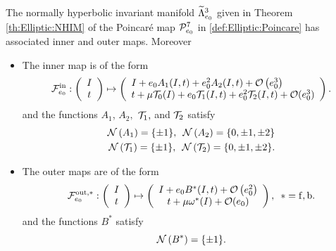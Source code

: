 \begin{theorem}\label{th:InnerAndOuter:Elliptic}
  The normally hyperbolic invariant manifold $\widetilde\Lambda^3_{e_0}$ given in Theorem \ref{th:Elliptic:NHIM}
  of the Poincar{\'e} map $\mathcal{P}^7_{e_0}$ in \eqref{def:Elliptic:Poincare} has associated inner and outer maps.
  Moreover
\begin{itemize}
  \item The inner map is of the form
    \begin{equation}\label{def:InnerMap:ell:th}
      \mathcal{F}_{e_0}^{\mathrm{in}}:\left(\begin{array}{c} I\\
          t
        \end{array}\right)\mapsto \left(\begin{array}{l} I+ e_0 A_1(I,t)+e_0^2 A_2(I,t)+\mathcal{O}\left(e_0^3\right)\\
          t+\mu\mathcal{T}_0(I)+e_0 \mathcal{T}_1(I,t)+e_0^2 \mathcal{T}_2(I,t)+\mathcal{O}( e_0^3)
        \end{array}\right).
    \end{equation}
    and the functions $A_1$, $A_2,$ $\mathcal{T}_1,$ and $\mathcal{T}_2$ satisfy
    \begin{align}
      \mathcal{N}\left(A_1\right)=\{\pm 1\},\,\,\, \mathcal{N}\left(A_2\right)=\{0,\pm 1,\pm 2\}\label{eq:InnerMap:I:1,2:Harmonics:0}\\
      \mathcal{N}\left(\mathcal{T}_1\right)=\{\pm 1\},\,\,\, \mathcal{N}\left(\mathcal{T}_2\right)=\{0,\pm 1,\pm 2\}\label{eq:InnerMap:t:1,2:Harmonics:0}.
    \end{align}
  \item The outer maps are of the form
    \begin{equation}\label{def:OuterMap:Elliptic:th}
      \mathcal{F}_{e_0}^{\mathrm{out},\ast}:\left(\begin{array}{c} I\\
          t
        \end{array}\right)\mapsto \left(\begin{array}{c} I+ e_0B^\ast(I,t) +\mathcal{O}\left(e_0^2\right)\\
          t+\mu\omega^\ast(I)+\mathcal{O}(e_0)
        \end{array}\right),\,\,\,\ast=\mathrm{f},\mathrm{b}.
    \end{equation}
    and the functions $B^\ast$ satisfy
    \begin{equation}\label{eq:OuterMap:I:Harmonics:0}
      \mathcal{N}\left(B^\ast\right)=\{\pm 1\}.
    \end{equation}
  \end{itemize}
\end{theorem}



